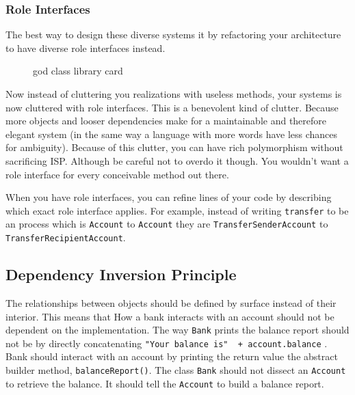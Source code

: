 \subsubsection{Role Interfaces}\label{solid-objects.md__role-interfaces}

The best way to design these diverse systems it by refactoring your
architecture to have diverse role interfaces instead.

\begin{figure}
\centering
{}
\caption{god class library card}
\end{figure}

Now instead of cluttering you realizations with useless methods, your
systems is now cluttered with role interfaces. This is a benevolent kind
of clutter. Because more objects and looser dependencies make for a
maintainable and therefore elegant system (in the same way a language
with more words have less chances for ambiguity). Because of this
clutter, you can have rich polymorphism without sacrificing ISP.
Although be careful not to overdo it though. You wouldn't want a role
interface for every conceivable method out there.

When you have role interfaces, you can refine lines of your code by
describing which exact role interface applies. For example, instead of
writing \texttt{transfer} to be an process which is \texttt{Account} to
\texttt{Account} they are \texttt{TransferSenderAccount} to
\texttt{TransferRecipientAccount}.

\subsection{Dependency Inversion
Principle}\label{solid-objects.md__dependency-inversion-principle}

The relationships between objects should be defined by surface instead
of their interior. This means that How a bank interacts with an account
should not be dependent on the implementation. The way \texttt{Bank}
prints the balance report should not be by directly concatenating
\texttt{"Your\ balance\ is"\ \ +\ account.balance} . Bank should
interact with an account by printing the return value the abstract
builder method, \texttt{balanceReport()}. The class \texttt{Bank} should
not dissect an \texttt{Account} to retrieve the balance. It should tell
the \texttt{Account} to build a balance report.

